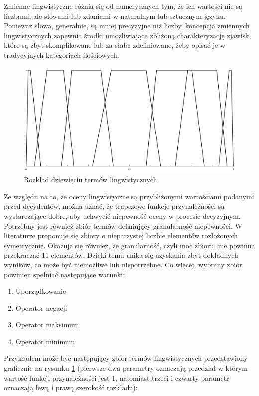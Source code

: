 Zmienne lingwistyczne różnią się od numerycznych tym, że ich wartości nie są
liczbami, ale słowami lub zdaniami w naturalnym lub sztucznym języku. Ponieważ
słowa, generalnie, są mniej precyzyjne niż liczby, koncepcja zmiennych
lingwistycznych zapewnia środki umożliwiające zbliżoną charakteryzację zjawisk,
które są zbyt skomplikowane lub za słabo zdefiniowane, żeby opisać je w
tradycyjnych kategoriach ilościowych.
\begin{figure}[ht]
  \includegraphics[width=\linewidth]
    {chapters/preferences/zbior_termow}
  \caption{Rozkład dziewięciu termów lingwistycznych}
  \label{fig:rozklad_dziewieciu_termow_lingwistycznych}
\end{figure}
Ze względu na to, że oceny lingwistyczne są przybliżonymi wartościami podanymi
przed decydentów, można uznać, że trapezowe funkcje przynależności są
wystarczające dobre, aby uchwycić niepewność oceny w procesie decyzyjnym.
Potrzebny jest również zbiór termów definiujący granularność niepewności. W
literaturze proponuje się zbiory o nieparzystej liczbie elementów rozłożonych
symetrycznie. Okazuje się również, że granularność, czyli moc zbioru, nie
powinna przekraczać 11 elementów. Dzięki temu unika się uzyskania zbyt
dokładnych wyników, co może być niemożliwe lub niepotrzebne. Co więcej, wybrany
zbiór powinien spełniać następujące warunki:
\begin{enumerate}[1)]
  \item Uporządkowanie
  \item Operator negacji
  \item Operator maksimum
  \item Operator minimum
\end{enumerate}

Przykładem może być następujący zbiór termów lingwistycznych przedstawiony
graficznie na rysunku \ref{fig:rozklad_dziewieciu_termow_lingwistycznych}
(pierwsze dwa parametry oznaczają przedział w którym wartość funkcji
przynależności jest 1, natomiast trzeci i czwarty parametr oznaczają lewą i
prawą szerokość rozkładu):

